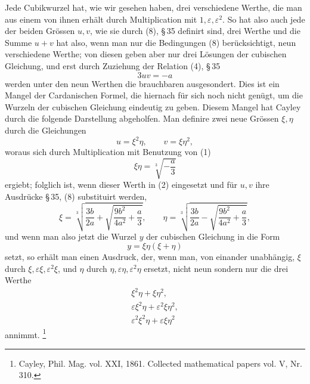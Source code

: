 \documentclass[11pt]{article}
\begin{document}
Jede Cubikwurzel hat, wie wir gesehen haben, drei verschiedene Werthe, die man aus einem von ihnen erhält durch Multiplication mit $1,\varepsilon,\varepsilon^2$. So hat also auch jede der beiden Grössen $u,v$, wie sie durch (8), \S\,35 definirt sind, drei Werthe und die Summe $u+v$ hat also, wenn man nur die Bedingungen (8) berücksichtigt, neun verschiedene Werthe; von diesen geben aber nur drei Lösungen der cubischen Gleichung, und erst durch Zuziehung der Relation (4), \S\,35
\begin{equation}
3uv=-a
\tag{1}
\end{equation}
werden unter den neun Werthen die brauchbaren ausgesondert. Dies ist ein Mangel der Cardanischen Formel, die hiernach für sich noch nicht genügt, um die Wurzeln der cubischen Gleichung eindeutig zu geben. Diesem Mangel hat Cayley durch die folgende Darstellung abgeholfen. Man definire zwei neue Grössen $\xi,\eta$ durch die Gleichungen
\begin{equation}
u=\xi^2\eta,
\qquad
v=\xi\eta^2,
\tag{2}
\end{equation}
woraus sich durch Multiplication mit Benutzung von (1)
\begin{equation}
\xi\eta=\sqrt[3]{-\frac a3}
\tag{3}
\end{equation}
ergiebt; folglich ist, wenn dieser Werth in (2) eingesetzt und für $u,v$ ihre Ausdrücke \S\,35, (8) substituirt werden,
\begin{equation}
\xi=\sqrt[3]{\frac{3b}{2a}+\sqrt{\frac{9b^2}{4a^2}+\frac a3}},\qquad
\eta=\sqrt[3]{\frac{3b}{2a}-\sqrt{\frac{9b^2}{4a^2}+\frac a3}},
\tag{4}
\end{equation}
und wenn man also jetzt die Wurzel $y$ der cubischen Gleichung in die Form
\begin{equation}
y=\xi\eta(\xi+\eta)
\tag{5}
\end{equation}
setzt, so erhält man einen Ausdruck, der, wenn man, von einander unabhängig, $\xi$ durch $\xi,\varepsilon\xi,\varepsilon^2\xi$, und $\eta$ durch $\eta,\varepsilon\eta,\varepsilon^2\eta$ ersetzt, nicht neun sondern nur die drei Werthe
\[
\begin{array}{c}
\xi^2\eta+\xi\eta^2,\\
\varepsilon\xi^2\eta+\varepsilon^2\xi\eta^2,\\
\varepsilon^2\xi^2\eta+\varepsilon\xi\eta^2
\end{array}
\]
annimmt.
\footnote{Cayley, Phil. Mag. vol. XXI, 1861. Collected mathematical papers vol. V, Nr. 310.}
\end{document}
